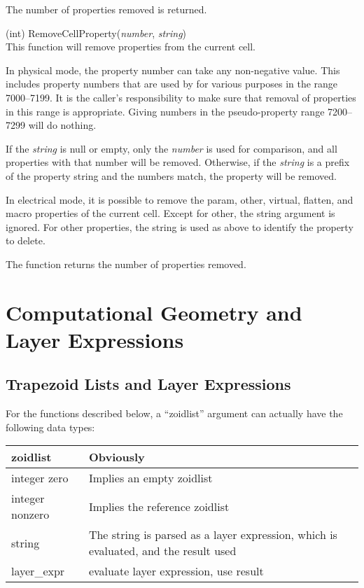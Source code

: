 \begin{description}
The number of properties removed is returned.

\item{(int) \vt RemoveCellProperty({\it number}, {\it string})}\\
This function will remove properties from the current cell.

In physical mode, the property number can take any non-negative value. 
This includes property numbers that are used by {\Xic} for various
purposes in the range 7000--7199.  It is the caller's responsibility
to make sure that removal of properties in this range is appropriate. 
Giving numbers in the pseudo-property range 7200--7299 will do
nothing.

If the {\it string} is null or empty, only the {\it number} is used
for comparison, and all properties with that number will be removed. 
Otherwise, if the {\it string} is a prefix of the property string and
the numbers match, the property will be removed.

In electrical mode, it is possible to remove the {\et param}, {\et
other}, {\et virtual}, {\et flatten}, and {\et macro} properties of
the current cell.  Except for {\et other}, the string argument is
ignored.  For {\et other} properties, the string is used as above to
identify the property to delete.

The function returns the number of properties removed.
\end{description}


\section{Computational Geometry and Layer Expressions}

\subsection{Trapezoid Lists and Layer Expressions}
\label{zoidlistarg}

For the functions described below, a ``zoidlist'' argument can
actually have the following data types:

\begin{tabular}{|l|p{4in}|} \hline
zoidlist & Obviously\\ \hline
integer zero & Implies an empty zoidlist\\ \hline
integer nonzero & Implies the reference zoidlist\\ \hline
string & The string is parsed as a layer expression,
  which is evaluated, and the result used\\ \hline
layer\_expr & evaluate layer expression, use result\\ \hline
\end{tabular}


